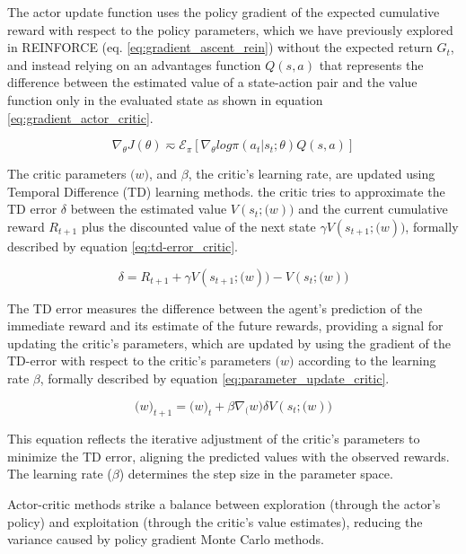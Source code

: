 The actor update function uses the policy gradient of the expected cumulative reward with respect to the policy parameters, which we have previously explored in REINFORCE (eq. \ref{eq:gradient_ascent_rein}) without the expected return $G_t$, and instead relying on an advantages function $Q(s,a)$ that represents the difference between the estimated value of a state-action pair and the value function only in the evaluated state as shown in equation \ref{eq:gradient_actor_critic}. 

\begin{equation}
    \label{eq:gradient_actor_critic}
    \nabla_\theta J(\theta) \eqsim \mathcal{E}_\pi[\nabla_\theta log \pi(a_t|s_t;\theta)Q(s,a)]
\end{equation}

The critic parameters $\mathcal(w)$, and $\beta$, the critic's learning rate, are updated using Temporal Difference (TD) learning methods. the critic tries to approximate the TD error $\delta$ between the estimated value $V(s_t;\mathcal(w))$ and the current cumulative reward $R_{t+1}$ plus the discounted value of the next state $\gamma V(s_{t+1};\mathcal(w))$, formally described by equation \ref{eq:td-error_critic}.

\begin{equation}
    \label{eq:td-error_critic}
    \delta = R_{t+1} + \gamma V(s_{t+1};\mathcal(w)) - V(s_t;\mathcal(w))
\end{equation}

The TD error measures the difference between the agent's prediction of the immediate reward and its estimate of the future rewards, providing a signal for updating the critic's parameters, which are updated by using the gradient of the TD-error with respect to the critic's parameters $\mathcal(w)$ according to the learning rate $\beta$, formally described by equation \ref{eq:parameter_update_critic}.

\begin{equation}
    \label{eq:parameter_update_critic}
    \mathcal(w)_{t+1} = \mathcal(w)_t + \beta \nabla_\mathcal(w) \delta V(s_t;\mathcal(w))
\end{equation}

This equation reflects the iterative adjustment of the critic's parameters to minimize the TD error, aligning the predicted values with the observed rewards. The learning rate ($\beta$) determines the step size in the parameter space.

Actor-critic methods strike a balance between exploration (through the actor's policy) and exploitation (through the critic's value estimates), reducing the variance caused by policy gradient Monte Carlo methods.


